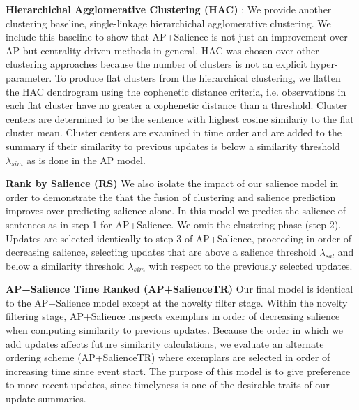 \textbf{Hierarchichal Agglomerative Clustering (HAC)} : We provide another clustering baseline, single-linkage hierarchichal agglomerative clustering.
We include this baseline to show that AP+Salience is not just an improvement
over AP but centrality driven methods in general.
HAC was chosen over other clustering approaches because the number of clusters 
is not an explicit hyper-parameter. To produce flat clusters from the hierarchical clustering, we flatten the HAC dendrogram
using the cophenetic distance criteria, i.e. observations in each flat cluster have no greater a cophenetic distance than a threshold.
Cluster centers are determined to be the sentence with highest cosine similariy to the flat cluster mean.
Cluster centers are examined in time order and are added to the summary if their similarity to previous updates is below a similarity threshold $\lambda_{sim}$ as is done in the AP model.

\textbf{Rank by Salience (RS)} 
We also isolate the impact of our salience model in order to demonstrate 
the that the fusion of clustering and salience prediction improves over
predicting salience alone.
In this model we predict the salience of sentences as in step 1 for 
AP+Salience. %
We omit the clustering phase (step 2).
Updates are selected identically to step 3 of AP+Salience, proceeding 
in order of decreasing salience, selecting updates that are above a salience 
threshold $\lambda_{sal}$ and below a similarity threshold $\lambda_{sim}$
with respect to the previously selected updates.


\textbf{AP+Salience Time Ranked (AP+SalienceTR)} Our final model is identical 
to the
AP+Salience model except at the novelty filter stage.
Within the novelty filtering stage, 
AP+Salience inspects exemplars in order of decreasing salience when computing
similarity to previous updates. Because the order in which we add updates
affects future similarity calculations, we evaluate an alternate ordering 
scheme (AP+SalienceTR) where exemplars are selected in order of increasing 
time since event start. The purpose of this model is to give preference to 
more recent updates, since timelyness is one of the desirable traits of our update
summaries.

